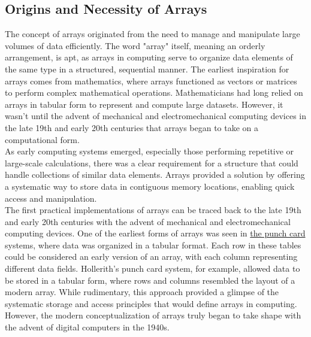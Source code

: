 \documentclass[12pt, oneside]{book}
\begin{document}
\subsection{Origins and Necessity of Arrays}
The concept of arrays originated from the need to manage and manipulate large volumes of data efficiently. The word "array" itself, meaning an orderly arrangement, is apt, as arrays in computing serve to organize data elements of the same type in a structured, sequential manner. The earliest inspiration for arrays comes from mathematics, where arrays functioned as vectors or matrices to perform complex mathematical operations. Mathematicians had long relied on arrays in tabular form to represent and compute large datasets. However, it wasn’t until the advent of mechanical and electromechanical computing devices in the late 19th and early 20th centuries that arrays began to take on a computational form. \\ As early computing systems emerged, especially those performing repetitive or large-scale calculations, there was a clear requirement for a structure that could handle collections of similar data elements. Arrays provided a solution by offering a systematic way to store data in contiguous memory locations, enabling quick access and manipulation.\\The first practical implementations of arrays can be traced back to the late 19th and early 20th centuries with the advent of mechanical and electromechanical computing devices. One of the earliest forms of arrays was seen in \href{https://en.wikipedia.org/wiki/Punched_card}{the punch card} systems, where data was organized in a tabular format. Each row in these tables could be considered an early version of an array, with each column representing different data fields. Hollerith's punch card system, for example, allowed data to be stored in a tabular form, where rows and columns resembled the layout of a modern array. While rudimentary, this approach provided a glimpse of the systematic storage and access principles that would define arrays in computing. However, the modern conceptualization of arrays truly began to take shape with the advent of digital computers in the 1940s.
\end{document}
